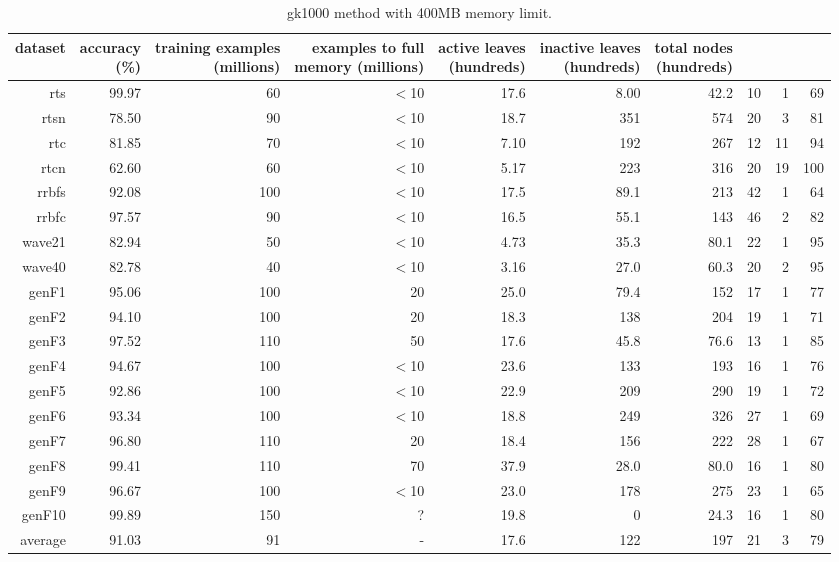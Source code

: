\clearpage
\begin{table}
\caption{{\sc gk1000} method with 400MB memory limit.}
\label{tab:gk1000-400MB}
\centering
\begin{tabular}{|r|r|r|r|r|r|r|r|r|r|}
\hline
dataset	&
\rotatebox{90}{\parbox{9em}{accuracy\\(\%)}} &
\rotatebox{90}{\parbox{9em}{training examples\\(millions)}} &
\rotatebox{90}{\parbox{9em}{examples to full\\memory (millions)}} &
\rotatebox{90}{\parbox{9em}{active leaves\\(hundreds)}} &
\rotatebox{90}{\parbox{9em}{inactive leaves\\(hundreds)}} &
\rotatebox{90}{\parbox{9em}{total nodes\\(hundreds)}} &
\rotatebox{90}{\parbox{9em}{tree depth}}	&
\rotatebox{90}{\parbox{9em}{training speed (\%)}} &
\rotatebox{90}{\parbox{9em}{prediction speed (\%)}} \\
\hline
{\sc rts} & 99.97 & 60 & $<$10 & 17.6 & 8.00 & 42.2 & 10 & 1 & 69 \\
{\sc rtsn} & 78.50 & 90 & $<$10 & 18.7 & 351 & 574 & 20 & 3 & 81 \\
{\sc rtc} & 81.85 & 70 & $<$10 & 7.10 & 192 & 267 & 12 & 11 & 94 \\
{\sc rtcn} & 62.60 & 60 & $<$10 & 5.17 & 223 & 316 & 20 & 19 & 100 \\
{\sc rrbfs} & 92.08 & 100 & $<$10 & 17.5 & 89.1 & 213 & 42 & 1 & 64 \\
{\sc rrbfc} & 97.57 & 90 & $<$10 & 16.5 & 55.1 & 143 & 46 & 2 & 82 \\
{\sc wave21} & 82.94 & 50 & $<$10 & 4.73 & 35.3 & 80.1 & 22 & 1 & 95 \\
{\sc wave40} & 82.78 & 40 & $<$10 & 3.16 & 27.0 & 60.3 & 20 & 2 & 95 \\
{\sc genF1} & 95.06 & 100 & 20 & 25.0 & 79.4 & 152 & 17 & 1 & 77 \\
{\sc genF2} & 94.10 & 100 & 20 & 18.3 & 138 & 204 & 19 & 1 & 71 \\
{\sc genF3} & 97.52 & 110 & 50 & 17.6 & 45.8 & 76.6 & 13 & 1 & 85 \\
{\sc genF4} & 94.67 & 100 & $<$10 & 23.6 & 133 & 193 & 16 & 1 & 76 \\
{\sc genF5} & 92.86 & 100 & $<$10 & 22.9 & 209 & 290 & 19 & 1 & 72 \\
{\sc genF6} & 93.34 & 100 & $<$10 & 18.8 & 249 & 326 & 27 & 1 & 69 \\
{\sc genF7} & 96.80 & 110 & 20 & 18.4 & 156 & 222 & 28 & 1 & 67 \\
{\sc genF8} & 99.41 & 110 & 70 & 37.9 & 28.0 & 80.0 & 16 & 1 & 80 \\
{\sc genF9} & 96.67 & 100 & $<$10 & 23.0 & 178 & 275 & 23 & 1 & 65 \\
{\sc genF10} & 99.89 & 150 & ? & 19.8 & 0 & 24.3 & 16 & 1 & 80 \\
\hline
average & 91.03 & 91 &  -  & 17.6 & 122 & 197 & 21 & 3 & 79 \\
\hline
\end{tabular}
\end{table}
